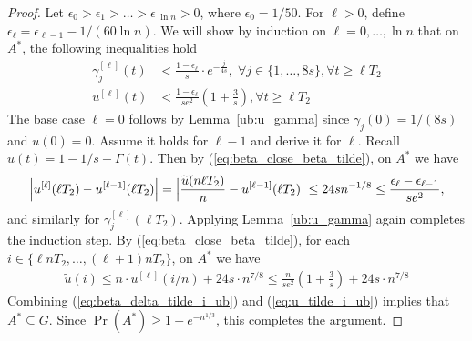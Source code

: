 \documentclass[a4paper,12pt]{article}
\begin{document}
\begin{proof}
Let $\epsilon_0 > \epsilon_1 > \ldots > \epsilon_{\;\ln{n}} > 0$, where $\epsilon_0 = 1/50$. For $\ell  > 0$, define $\epsilon_{\ell}= \epsilon_{\ell -1} - 1/(60 \ln{n})$. We will show by induction on $\ell = 0, \ldots, \ln{n}$ that on $A^*$, the following inequalities hold
\begin{align}
\gamma_j^{[\ell ]}(t) & < \frac{1 - \epsilon_{\ell }}{s} \cdot e^{-\frac{j}{4s}}, \; \forall j \in \{1, \ldots, 8s \}, \forall t \geq \ell T_2 \\
u^{[\ell ]}(t) & < \frac{1 - \epsilon_{\ell }}{s  e^{2}}  \left(1 + \frac{3}{s}\right), \forall t \geq \ell T_2
\end{align}
The base case $\ell =0$ follows by Lemma~\ref{ub:u_gamma} since $\gamma_j(0) = 1/(8s)$ and $u(0) = 0$. Assume it holds for $\ell -1$ and derive it for $\ell $. Recall $u(t) = 1 - 1/s - \Gamma(t)$. Then by (\ref{eq:beta_close_beta_tilde}), on $A^*$ we have
\begin{align}
\Bigl | u^{[\ell ]}(\ell T_2) - u^{[\ell -1]}(\ell T_2) \Bigr |  = \Bigl | \frac{\widetilde{u}(n \ell T_2)}{n} - u^{[\ell -1]}(\ell T_2) \Bigr | \leq 24s n^{-1/8} \le \frac{\epsilon_{\ell } - \epsilon_{\ell -1}}{se^2},
\end{align}
and similarly for $\gamma_j^{[\ell ]}(\ell T_2)$.
Applying Lemma~\ref{ub:u_gamma} again completes the induction step.
By (\ref{eq:beta_close_beta_tilde}), for each $i \in \{\ell nT_2, \ldots, (\ell +1)nT_2\}$, on $A^*$ we have
\begin{align} \label{eq:u_tilde_i_ub}
\widetilde{u}(i) \leq n \cdot u^{[\ell ]}(i/n) + 24s \cdot n^{7/8} \leq \frac{n}{se^2} \left(1 + \frac{3}{s} \right) + 24s \cdot n^{7/8}
\end{align}
Combining (\ref{eq:beta_delta_tilde_i_ub}) and (\ref{eq:u_tilde_i_ub}) implies that  $A^* \subseteq G$. Since $\Pr(A^*) \geq 1- e^{-n^{1/3}}$, this completes the argument.
\end{proof}
\end{document}
